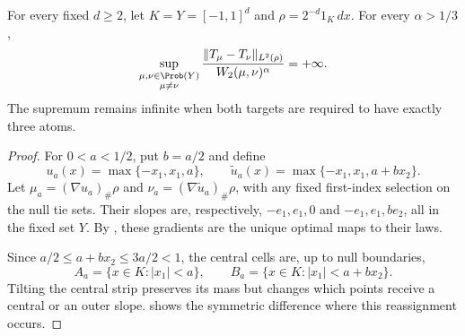 \begin{proposition}\label{sharpness:exponent}
For every fixed $d\ge2$, let $K=Y=[-1,1]^d$ and
$\rho=2^{-d}1_K\,dx$.  For every $\alpha>1/3$,
\[
 \sup_{\substack{\mu,\nu\in\Prob(Y)\\ \mu\ne\nu}}
 \frac{\|T_\mu-T_\nu\|_{L^2(\rho)}}{W_2(\mu,\nu)^\alpha}
 =+\infty.
\]
The supremum remains infinite when both targets are required to have
exactly three atoms.
\end{proposition}

\begin{proof}
For $0<a<1/2$, put $b=a/2$ and define
\begin{equation}\label{sharpness:potentials}
 u_a(x)=\max\{-x_1,x_1,a\},\qquad
 \widetilde u_a(x)=\max\{-x_1,x_1,a+bx_2\}.
\end{equation}
Let $\mu_a=(\nabla u_a)_\#\rho$ and
$\nu_a=(\nabla\widetilde u_a)_\#\rho$, with any fixed first-index
selection on the null tie sets.  Their slopes are, respectively,
$-e_1,e_1,0$ and $-e_1,e_1,be_2$, all in the fixed set $Y$.
By , these gradients are the unique optimal
maps to their laws.

Since $a/2\le a+bx_2\le3a/2<1$, the central cells are, up to null
boundaries,
\[
 A_a=\{x\in K:|x_1|<a\},\qquad
 B_a=\{x\in K:|x_1|<a+bx_2\}.
\]
Tilting the central strip preserves its mass but changes which points
receive a central or an outer slope.  shows
the symmetric difference where this reassignment occurs.


\end{proof}

